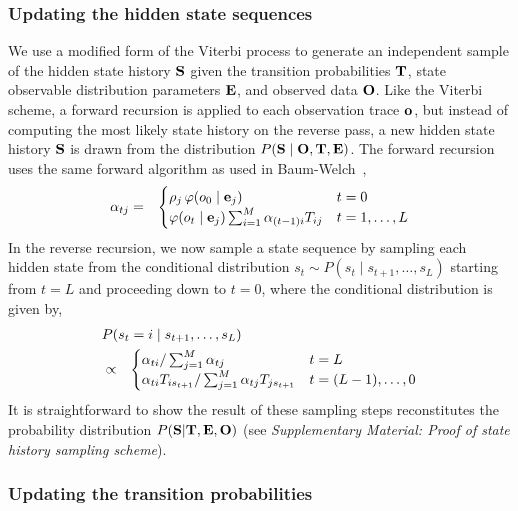\documentclass[aps,pre,twocolumn,superscriptaddress,nofootinbib,longbibliography]{revtex4-1}
\newcommand{\bfm}[1]{{\bf #1}}
\begin{document}
{%
\subsubsection{Updating the hidden state sequences}

We use a modified form of the Viterbi process to generate an independent sample of the hidden state history $\bfm{S}$ given the transition probabilities $\bfm{T}$, state observable distribution parameters $\bfm{E}$, and observed data $\bfm{O}$.
Like the Viterbi scheme, a forward recursion is applied to each observation trace $\bfm{o}^{}$, but instead of computing the most likely state history on the reverse pass, a new hidden state history $\bfm{S}$ is drawn from the distribution $P(\bfm{S} \mid \bfm{O}, \bfm{T}, \bfm{E})$.
The forward recursion uses the same forward algorithm as used in Baum-Welch~\cite{baum:1970:ann-math-statist:baum-welch}, 
\begin{eqnarray}
\alpha_{tj} &=& \begin{cases}
\rho_j \, \varphi(o_0 \mid \bfm{e}_j) & t = 0 \\
\varphi(o_t \mid \bfm{e}_j) \sum_{i=1}^M \alpha_{(t-1)i} T_{ij} & t = 1,\ldots,L
\end{cases}
\end{eqnarray}
In the reverse recursion, we now sample a state sequence by sampling each hidden state from the conditional distribution $s_t \sim P(s_t \mid s_{t+1}, \ldots, s_L)$ starting from $t = L$ and proceeding down to $t = 0$, where the conditional distribution is given by,
\begin{eqnarray}
\lefteqn{P(s_t = i \mid s_{t+1}, \ldots, s_L)} \\
&\propto& \begin{cases}
\alpha_{t i} / \sum_{j=1}^M \alpha_{t j} & t = L \\
\alpha_{t i} T_{i s_{t+1}} / \sum_{j=1}^M \alpha_{t j} T_{j s_{t+1}} & t = (L-1),\ldots,0
\end{cases} \nonumber
\end{eqnarray} 
It is straightforward to show the result of these sampling steps reconstitutes the probability distribution $P(\bfm{S} | \bfm{T}, \bfm{E}, \bfm{O})$ (see \emph{Supplementary Material: Proof of state history sampling scheme}).

\subsubsection{Updating the transition probabilities}

}
\end{document}
